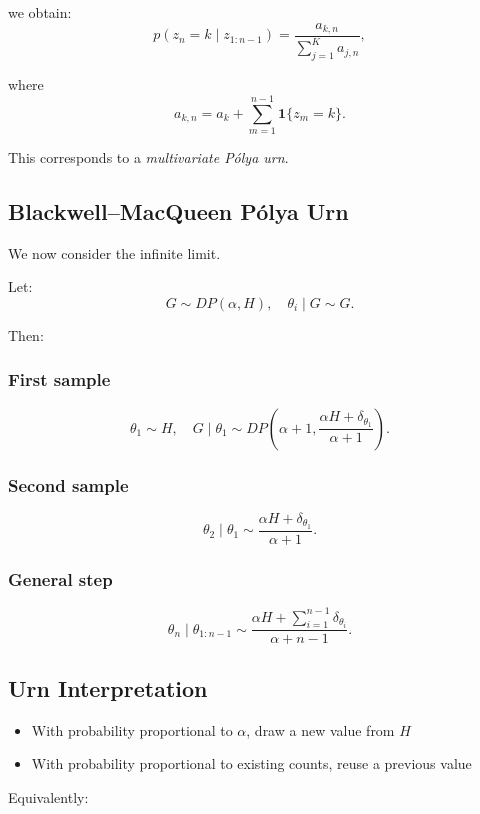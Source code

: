 \documentclass[12pt,oneside]{book}
\numberwithin{equation}{section}
\theoremstyle{definition}
\theoremstyle{plain}
\theoremstyle{remark}
\begin{document}
we obtain:
\[
p(z_n = k \mid z_{1:n-1})
=
\frac{a_{k,n}}{\sum_{j=1}^K a_{j,n}},
\]

where
\[
a_{k,n} = a_k + \sum_{m=1}^{n-1} \mathbf{1}\{z_m = k\}.
\]

This corresponds to a \emph{multivariate Pólya urn}.

\subsection{Blackwell--MacQueen Pólya Urn}

We now consider the infinite limit.

Let:
\[
G \sim DP(\alpha, H), \quad \theta_i \mid G \sim G.
\]

Then:

\subsubsection*{First sample}

\[
\theta_1 \sim H,
\quad
G \mid \theta_1 \sim DP\left(\alpha + 1, \frac{\alpha H + \delta_{\theta_1}}{\alpha + 1}\right).
\]

\subsubsection*{Second sample}

\[
\theta_2 \mid \theta_1
\sim
\frac{\alpha H + \delta_{\theta_1}}{\alpha + 1}.
\]

\subsubsection*{General step}

\[
\theta_n \mid \theta_{1:n-1}
\sim
\frac{\alpha H + \sum_{i=1}^{n-1} \delta_{\theta_i}}{\alpha + n - 1}.
\]

\subsection*{Urn Interpretation}

\begin{itemize}
\item With probability proportional to $\alpha$, draw a new value from $H$
\item With probability proportional to existing counts, reuse a previous value
\end{itemize}

Equivalently:
\end{document}
